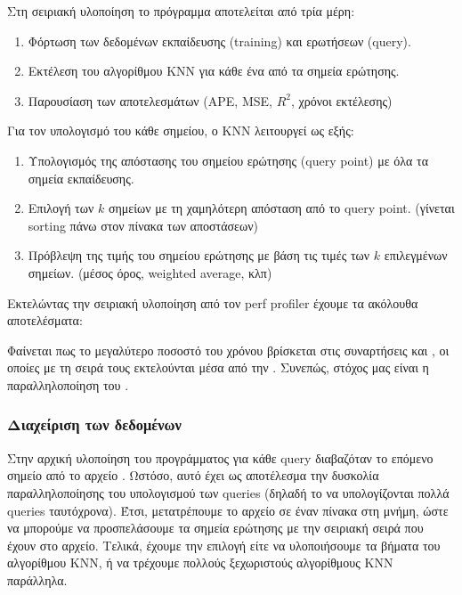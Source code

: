 \documentclass[11pt]{scrartcl} %
\begin{document}
Στη σειριακή υλοποίηση το πρόγραμμα αποτελείται από τρία μέρη: 

\begin{enumerate}
    \item Φόρτωση των δεδομένων εκπαίδευσης (training) και ερωτήσεων (query).
    \item Εκτέλεση του αλγορίθμου KNN για κάθε ένα από τα σημεία ερώτησης.
    \item Παρουσίαση των αποτελεσμάτων (APE, MSE, $R^2$, χρόνοι εκτέλεσης)
\end{enumerate}

Για τον υπολογισμό του κάθε σημείου, ο KNN λειτουργεί ως εξής:

\begin{enumerate}
    \item Υπολογισμός της απόστασης του σημείου ερώτησης (query point) με όλα τα σημεία εκπαίδευσης.
    \item Επιλογή των $k$ σημείων με τη χαμηλότερη απόσταση από το query point. (γίνεται sorting πάνω στον πίνακα των αποστάσεων)
    \item Πρόβλεψη της τιμής του σημείου ερώτησης με βάση τις τιμές των $k$ επιλεγμένων σημείων. (μέσος όρος, weighted average, κλπ)
\end{enumerate}

Εκτελώντας την σειριακή υλοποίηση από τον perf profiler έχουμε τα ακόλουθα αποτελέσματα:



Φαίνεται πως το μεγαλύτερο ποσοστό του χρόνου βρίσκεται στις συναρτήσεις  και , οι οποίες με τη σειρά τους εκτελούνται 
μέσα από την . Συνεπώς, στόχος μας είναι η παραλληλοποίηση του .

\subsubsection{Διαχείριση των δεδομένων}

Στην αρχική υλοποίηση του προγράμματος για κάθε query διαβαζόταν το επόμενο σημείο από το αρχείο . 
Ωστόσο, αυτό έχει ως αποτέλεσμα την δυσκολία παραλληλοποίησης του υπολογισμού των queries (δηλαδή το να υπολογίζονται πολλά queries ταυτόχρονα).
Έτσι, μετατρέπουμε το αρχείο  σε έναν πίνακα στη μνήμη, ώστε να μπορούμε να προσπελάσουμε τα σημεία ερώτησης με την σειριακή σειρά που έχουν στο αρχείο.
Τελικά, έχουμε την επιλογή είτε να υλοποιήσουμε τα βήματα του αλγορίθμου KNN, ή να τρέχουμε πολλούς ξεχωριστούς αλγορίθμους KNN παράλληλα.
\end{document}
